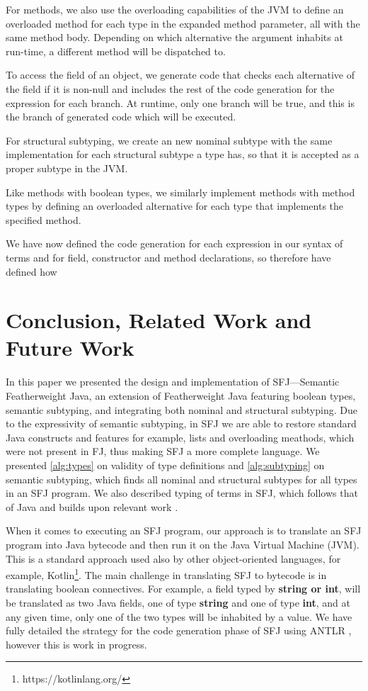 \documentclass[runningheads]{llncs}
\begin{document}
For methods, we also use the overloading capabilities of the JVM to define an  overloaded method for each type in the expanded method parameter, all with the same method body.
Depending on which alternative the argument inhabits at run-time, a different method will be dispatched to.

To access the field of an object, we generate code that checks each alternative of the field if it is non-null and includes the rest of the code generation for the expression for each branch. At runtime, only one branch will be true, and this is the branch of generated code which will be executed.

For structural subtyping, we create an new nominal subtype with the same implementation for each structural subtype a type has, so that it is accepted as a proper subtype in the JVM.

Like methods with boolean types, we similarly implement methods with method types by defining an overloaded alternative for each type that implements the specified method.

We have now defined the code generation for each expression in our syntax of terms and for field, constructor and method declarations, so therefore have defined how

\section{Conclusion, Related Work and Future Work}
\label{sec:conclusion}

In this paper we presented the design and implementation of SFJ---Semantic Featherweight Java, an extension of Featherweight Java featuring boolean types, semantic subtyping, and integrating both nominal and structural subtyping. Due to the expressivity of semantic subtyping, in SFJ we are able to restore standard Java constructs and features for example, lists and overloading meathods, which were not present in FJ, thus making SFJ a more complete language.
We presented \autoref{alg:types} on validity of type definitions and
\autoref{alg:subtyping} on semantic subtyping, which finds all nominal and structural subtypes for all types in an SFJ program. We also described typing of terms in SFJ, which follows that of Java and builds upon relevant work \cite{Dardha2013,Dardha2017}.

When it comes to executing an SFJ program, our approach is to translate an SFJ program into Java bytecode and then run it on the Java Virtual Machine (JVM). This is a standard approach used also by other object-oriented languages, for example, Kotlin\footnote{https://kotlinlang.org/}.
The main challenge in translating SFJ to bytecode is in translating boolean connectives.
For example, a field typed by \textbf{string or int}, will be translated as two Java fields, one of type \textbf{string} and one of type \textbf{int}, and at any given time, only one of the two types will be inhabited by a value. We have fully detailed the strategy for the code generation phase of SFJ using ANTLR \cite{parr2013}, however this is work in progress.
\end{document}
